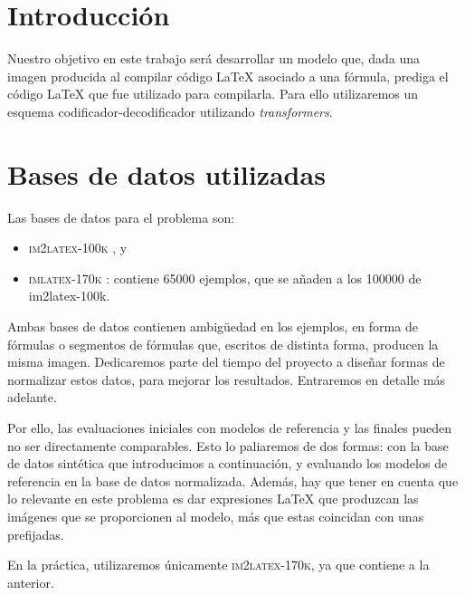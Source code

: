 \documentclass[a4paper, 20pt, dvipsnames]{article}
\begin{document}
{\parskip=2pt
	\tableofcontents
}
\pagebreak

\newpage

\section{Introducción}

Nuestro objetivo en este trabajo será desarrollar un modelo que, dada una imagen
producida al compilar código \LaTeX{} asociado a una fórmula, prediga el código
\LaTeX{} que fue utilizado para compilarla. Para ello utilizaremos un esquema
codificador-decodificador utilizando \emph{transformers}.


\section{Bases de datos utilizadas}
\label{sec:datasets}

Las bases de datos para el problema son:

\begin{itemize}
\item
  \textsc{im2latex-100k} \cite{kanervisto_anssi_2016_56198}, y
\item
  \textsc{imlatex-170k} \cite{im2latex_170k}: contiene 65000 ejemplos, que se
  añaden a los 100000 de im2latex-100k.
\end{itemize}

Ambas bases de datos contienen ambigüedad en los ejemplos, en forma de fórmulas
o segmentos de fórmulas que, escritos de distinta forma, producen la misma
imagen. Dedicaremos parte del tiempo del proyecto a diseñar formas de normalizar
estos datos, para mejorar los resultados. Entraremos en detalle más adelante.

Por ello, las evaluaciones iniciales con modelos de referencia y las finales
pueden no ser directamente comparables. Esto lo paliaremos de dos formas: con la
base de datos sintética que introducimos a continuación, y evaluando los modelos
de referencia en la base de datos normalizada. Además, hay que tener en cuenta
que lo relevante en este problema es dar expresiones \LaTeX{} que produzcan las
imágenes que se proporcionen al modelo, más que estas coincidan con unas
prefijadas.

En la práctica, utilizaremos únicamente \textsc{im2latex-170k}, ya que contiene
a la anterior.
\end{document}

